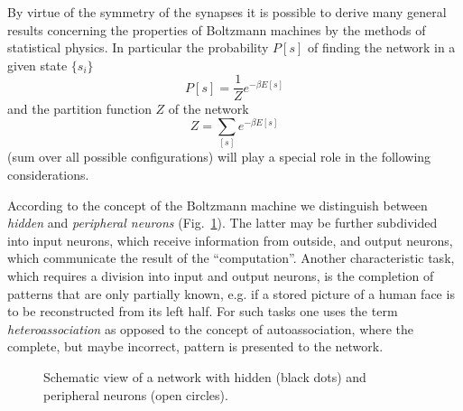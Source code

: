 By virtue of the symmetry of the synapses it is possible to derive many general results concerning the properties of Boltzmann machines by the methods of statistical physics. In particular the probability $P[s]$ of finding the network in a given state $\{s_i\}$
\begin{equation}\label{BMProb}
P[s]=\frac{1}{Z}e^{-\beta E[s]}
\end{equation}
and the partition function $Z$ of the network
\begin{equation}\label{BMPartition}
Z=\sum_{[s]}e^{-\beta E[s]}
\end{equation}
(sum over all possible configurations) will play a special role in the following considerations.

According to the concept of the Boltzmann machine we distinguish between \emph{hidden} and \emph{peripheral neurons} (Fig.~\ref{PeripheralNeurons}). The latter may be further subdivided into input neurons, which receive information from outside, and output neurons, which communicate the result of the ``computation''.
Another characteristic task, which requires a division into input and output neurons, is the completion of patterns that are only partially known, e.g. if a stored picture of a human face is to be reconstructed from its left half. For such tasks one uses the term \emph{heteroassociation} as opposed to the concept of autoassociation, where the complete, but maybe incorrect, pattern is presented to the network.
\begin{figure}[h!t]
\centering
{}
\caption{Schematic view of a network with hidden (black dots) and peripheral neurons (open circles).}\label{PeripheralNeurons}
\end{figure}


